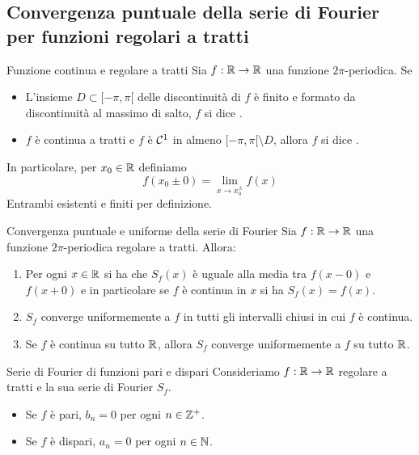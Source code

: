 \documentclass{article}
\begin{document}
\subsection{Convergenza puntuale della serie di Fourier per funzioni regolari a tratti}

\begin{definition}{Funzione continua e regolare a tratti}{}
    Sia $f:\mathbb{R} \to \mathbb{R}$ una funzione $2\pi$-periodica. Se \begin{itemize}
        \item L'insieme $D \subset [-\pi,\pi[$ delle discontinuità di $f$ è finito e formato da discontinuità al massimo di salto, $f$ si dice .
        \item $f$ è continua a tratti e $f$ è $\mathcal{C}^1$ in almeno $[-\pi,\pi[\setminus D$, allora $f$ si dice .
    \end{itemize}
    In particolare, per $x_0 \in \mathbb{R}$ definiamo
    \[f(x_0\pm 0) = \lim_{x \to x_0^\pm} f(x)\]
    Entrambi esistenti e finiti per definizione.
\end{definition}

\begin{theorem}{Convergenza puntuale e uniforme della serie di Fourier}{}
    Sia $f:\mathbb{R}\to\mathbb{R}$ una funzione $2\pi$-periodica regolare a tratti. Allora:\begin{enumerate}
        \item Per ogni $x \in \mathbb{R}$ si ha che $S_f(x)$ è uguale alla media tra $f(x-0)$ e $f(x+0)$ e in particolare se $f$ è continua in $x$ si ha $S_f(x) = f(x)$.
        \item $S_f$ converge uniformemente a $f$ in tutti gli intervalli chiusi in cui $f$ è continua.
        \item Se $f$ è continua su tutto $\mathbb{R}$, allora $S_f$ converge uniformemente a $f$ su tutto $\mathbb{R}$.
    \end{enumerate}
\end{theorem}

\begin{remark}{Serie di Fourier di funzioni pari e dispari}{}
    Consideriamo $f:\mathbb{R}\to\mathbb{R}$ regolare a tratti e la sua serie di Fourier $S_f$.\begin{itemize}
        \item Se $f$ è pari, $b_n = 0$ per ogni $n \in \mathbb{Z}^+$.
        \item Se $f$ è dispari, $a_n = 0$ per ogni $n \in \mathbb{N}$.
    \end{itemize}
\end{remark}
\end{document}
